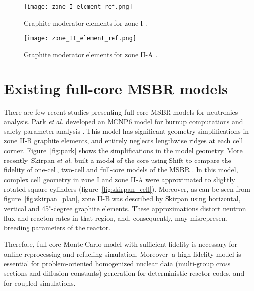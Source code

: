 \begin{figure}[hbp!] %
  \centering
  \vspace{-0.3em}
  \texttt{[image: zone\_I\_element\_ref.png]}
  \caption{Graphite moderator elements for zone I \cite{robertson_conceptual_1971,rykhlevskii_full-core_2017}.}
  \vspace{-0.6em}
  \label{fig:I_element_ref}
\end{figure}
\FloatBarrier

\begin{figure}[hbp!] %
  \centering
  \vspace{-0.3em}
  \texttt{[image: zone\_II\_element\_ref.png]}
  \caption{Graphite moderator elements for zone II-A \cite{robertson_conceptual_1971,rykhlevskii_full-core_2017}.}
  \vspace{-0.6em}
  \label{fig:II_element_ref}
\end{figure}
\FloatBarrier

\section{Existing full-core MSBR models}
There are few recent studies presenting full-core \gls{MSBR} models for neutronics analysis. Park \emph{et al.} developed an MCNP6 model for burnup computations and safety parameter analysis \cite{park_whole_2015}. This model has significant geometry simplifications in zone II-B graphite elements, and entirely neglects lengthwise ridges at each cell corner. Figure~\ref{fig:park} shows the simplifications in the model geometry.  More recently, Skirpan \emph{et al.} built a model of the core using Shift \cite{pandya_implementation_2016} to compare the fidelity of one-cell, two-cell and full-core models of the \gls{MSBR} \cite{skirpan_fuel_2017}. In this model, complex cell geometry in zone I and zone II-A were approximated to slightly rotated square cylinders (figure~\ref{fig:skirpan_cell}). Moreover, as can be seen from figure~\ref{fig:skirpan_plan}, zone II-B was described by Skirpan \cite{skirpan_fuel_2017} using horizontal, vertical and 45$^\circ$-degree graphite elements. These approximations distort neutron flux and reacton rates in that region, and, consequently, may misrepresent breeding parameters of the reactor.

Therefore, full-core Monte Carlo model with sufficient fidelity is necessary for online reprocessing and refueling simulation. Moreover, a high-fidelity model is essential for problem-oriented homogenized nuclear data (multi-group cross sections and diffusion constants) generation for deterministic reactor codes, and for coupled simulations.

